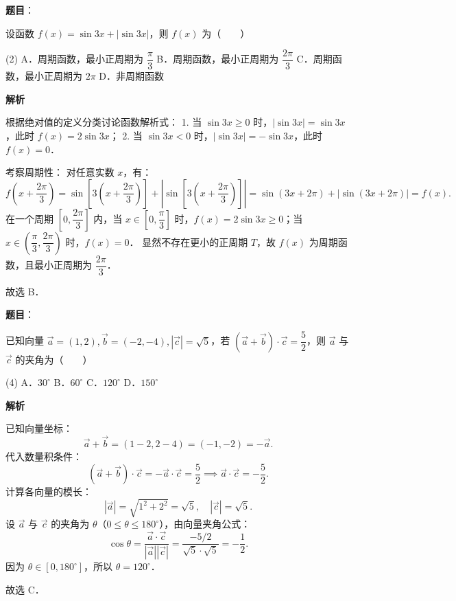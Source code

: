 \begin{answer}

\textbf{题目}：

设函数 $f(x) = \sin 3x + |\sin 3x|$，则 $f(x)$ 为\mbox{（　　）}

\begin{gkopts}(2)
\task A．周期函数，最小正周期为 $\dfrac{\pi}{3}$
\task B．周期函数，最小正周期为 $\dfrac{2\pi}{3}$
\task C．周期函数，最小正周期为 $2\pi$
\task D．非周期函数
\end{gkopts}

\textbf{解析}

根据绝对值的定义分类讨论函数解析式：
1. 当 $\sin 3x \geqslant 0$ 时，$|\sin 3x| = \sin 3x$，此时 $f(x) = 2\sin 3x$；
2. 当 $\sin 3x < 0$ 时，$|\sin 3x| = -\sin 3x$，此时 $f(x) = 0$．

考察周期性：
对任意实数 $x$，有：
\nopagebreak[4]
\[
f\left(x + \dfrac{2\pi}{3}\right) = \sin\left[3\left(x + \dfrac{2\pi}{3}\right)\right] + \left|\sin\left[3\left(x + \dfrac{2\pi}{3}\right)\right]\right| = \sin(3x + 2\pi) + |\sin(3x + 2\pi)| = f(x).
\]
在一个周期 $\left[0, \dfrac{2\pi}{3}\right]$ 内，当 $x \in \left[0, \dfrac{\pi}{3}\right]$ 时，$f(x) = 2\sin 3x \geqslant 0$；当 $x \in \left(\dfrac{\pi}{3}, \dfrac{2\pi}{3}\right)$ 时，$f(x) = 0$．
显然不存在更小的正周期 $T$，故 $f(x)$ 为周期函数，且最小正周期为 $\dfrac{2\pi}{3}$．

故选 B．


\end{answer}
\begin{answer}

\textbf{题目}：

已知向量 $\vec{a} = (1, 2), \vec{b} = (-2, -4), |\vec{c}| = \sqrt{5}$，若 $(\vec{a} + \vec{b}) \cdot \vec{c} = \dfrac{5}{2}$，则 $\vec{a}$ 与 $\vec{c}$ 的夹角为\mbox{（　　）}

\begin{gkopts}(4)
\task A．$30^\circ$
\task B．$60^\circ$
\task C．$120^\circ$
\task D．$150^\circ$
\end{gkopts}

\textbf{解析}

已知向量坐标：
\nopagebreak[4]
\[
\vec{a} + \vec{b} = (1 - 2, 2 - 4) = (-1, -2) = -\vec{a}.
\]
代入数量积条件：
\nopagebreak[4]
\[
(\vec{a} + \vec{b}) \cdot \vec{c} = -\vec{a} \cdot \vec{c} = \dfrac{5}{2} \implies \vec{a} \cdot \vec{c} = -\dfrac{5}{2}.
\]
计算各向量的模长：
\nopagebreak[4]
\[
|\vec{a}| = \sqrt{1^2 + 2^2} = \sqrt{5}, \quad |\vec{c}| = \sqrt{5}.
\]
设 $\vec{a}$ 与 $\vec{c}$ 的夹角为 $\theta$（$0 \leqslant \theta \leqslant 180^\circ$），由向量夹角公式：
\nopagebreak[4]
\[
\cos\theta = \dfrac{\vec{a} \cdot \vec{c}}{|\vec{a}||\vec{c}|} = \dfrac{-5/2}{\sqrt{5} \cdot \sqrt{5}} = -\dfrac{1}{2}.
\]
因为 $\theta \in [0, 180^\circ]$，所以 $\theta = 120^\circ$．

故选 C．


\end{answer}
